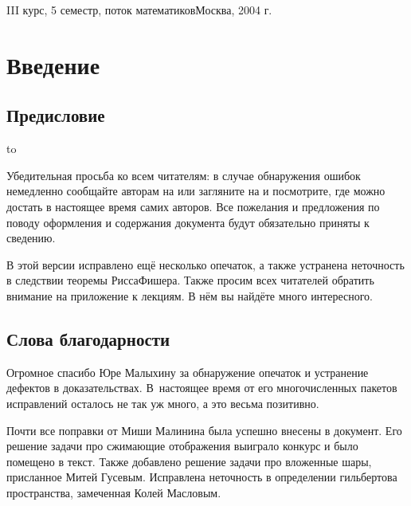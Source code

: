 \documentclass[a4paper]{article}
\begin{document}
{III курс, 5 семестр, поток математиков}{Москва, 2004 г.} \pagebreak

\pagestyle{plain}
\tableofcontents
\pagebreak

\section*{Введение}

\subsection*{Предисловие}

\hbox to 

\vskip 5pt

Убедительная просьба ко всем читателям: в случае обнаружения ошибок
немедленно сообщайте авторам на \dmvnmail{} или загляните на \dmvnwebsite{} и посмотрите, где можно
достать в настоящее время самих авторов. Все пожелания и предложения по поводу оформления
и содержания документа будут обязательно приняты к сведению.

В этой версии исправлено ещё несколько опечаток, а также устранена неточность в следствии теоремы Рисса\ч Фишера.
Также просим всех читателей обратить внимание на приложение к лекциям. В нём вы найдёте много интересного.

\subsection*{Слова благодарности}

Огромное спасибо Юре Малыхину за обнаружение опечаток и устранение дефектов в доказательствах.
В~настоящее время от его многочисленных пакетов исправлений осталось не так уж много,
а это весьма позитивно.

Почти все поправки от Миши Малинина была успешно внесены в документ. Его решение задачи
про сжимающие отображения выиграло конкурс и было помещено в текст.
Также добавлено решение задачи про вложенные шары, присланное Митей Гусевым.
Исправлена неточность в определении гильбертова пространства, замеченная Колей Масловым.
\end{document}
